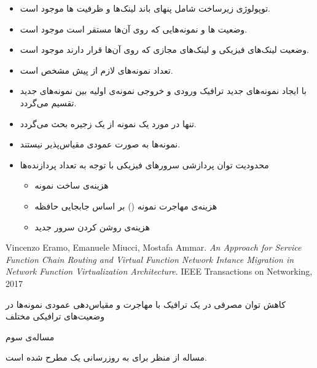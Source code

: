 \documentclass{beamer}
\makeatletter
\newcommand{\RTList}{\raggedleft\rightskip\@totalleftmargin}
\makeatother
\begin{document}
\begin{persian}
\begin{frame}
\begin{itemize}
		\item توپولوژی زیرساخت شامل پنهای باند لینک‌ها و ظرفیت ها موجود است.
		\item وضعیت ها و نمونه‌هایی که روی آن‌ها مستقر است موجود است.
		\item وضعیت لینک‌های فیزیکی و لینک‌های مجازی که روی آن‌ها قرار دارند موجود است.
		\item تعداد نمونه‌های لازم از پیش مشخص است.
		\item با ایجاد نمونه‌های جدید ترافیک ورودی و خروجی نمونه‌ی اولیه بین نمونه‌های جدید تقسیم می‌گردد.
		\item تنها در مورد یک نمونه از یک زجیره بحث می‌گردد.
	\end{itemize}
\end{frame}
\begin{frame}
	\begin{itemize}\RTList
		\item نمونه‌ها به صورت عمودی مقیاس‌پذیر نیستند.
		\item محدودیت توان پردازشی سرورهای فیزیکی با توجه به تعداد پردازنده‌ها
		\begin{itemize}\RTList
			\item هزینه‌ی ساخت نمونه
			\item هزینه‌ی مهاجرت نمونه () بر اساس جابجایی حافظه
			\item هزینه‌ی روشن کردن سرور جدید
		\end{itemize}
	\end{itemize}
\end{frame}
\begin{frame}
	\begin{latin}\begin{thebibliography}{9}
		Vincenzo Eramo, Emanuele Miucci, Mostafa Ammar.
		\textit{An Approach for Service Function Chain Routing and Virtual Function Network Intance Migration in Network Function Virtualization Architecture}. 
		IEEE Transactions on Networking, 2017
	\end{thebibliography}\end{latin}
	\par
	کاهش توان مصرفی در یک ترافیک 
	با مهاجرت و مقیاس‌دهی عمودی نمونه‌ها در وضعیت‌های ترافیکی مختلف
\end{frame}
\begin{frame}{مساله‌ی سوم}
	\par
	مساله از منظر  برای به روزرسانی یک 
	مطرح شده است.
\end{frame}

\end{persian}
\end{document}
